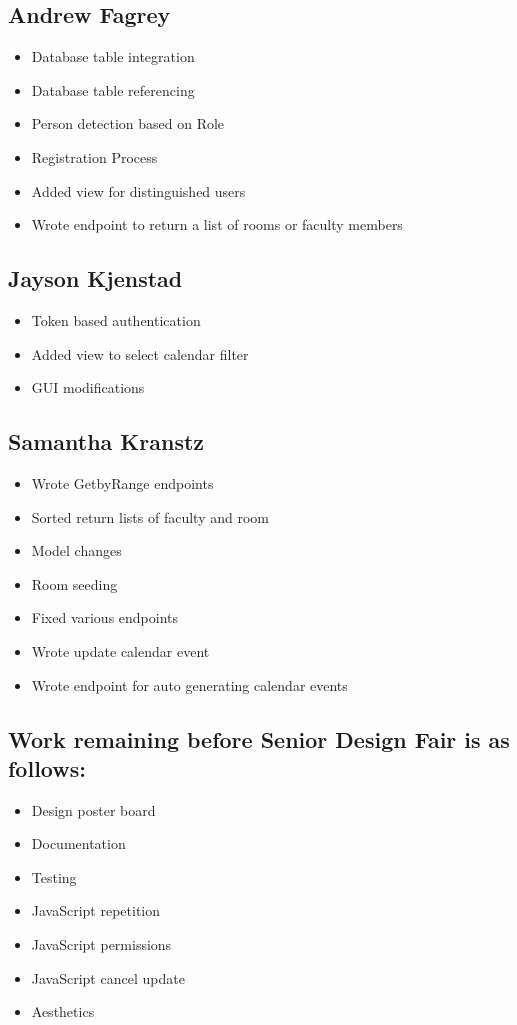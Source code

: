 \documentclass{article}
\begin{document}
{\subsection*{Andrew Fagrey}
\begin{itemize}
\item Database table integration
\item Database table referencing
\item Person detection based on Role
\item Registration Process
\item Added view for distinguished users
\item Wrote endpoint to return a list of rooms or faculty members
\end{itemize}

\subsection*{Jayson Kjenstad}
\begin{itemize}
\item Token based authentication
\item Added view to select calendar filter
\item GUI modifications
\end{itemize}

\subsection*{Samantha Kranstz}
\begin{itemize}
\item Wrote GetbyRange endpoints
\item Sorted return lists of faculty and room
\item Model changes
\item Room seeding
\item Fixed various endpoints
\item Wrote update calendar event
\item Wrote endpoint for auto generating calendar events
\end{itemize}

\subsection*{Work remaining before Senior Design Fair is as follows:}
\begin{itemize}
\item Design poster board
\item Documentation
\item Testing
\item JavaScript repetition
\item JavaScript permissions
\item JavaScript cancel update
\item Aesthetics
\end{itemize}

}
\end{document}
